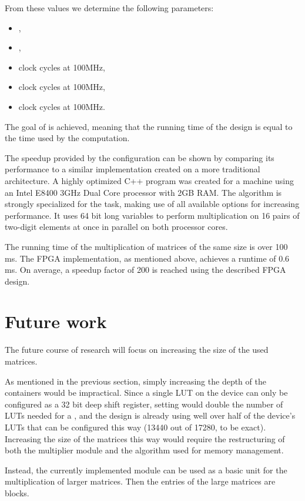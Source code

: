 \documentclass[11pt,twoside]{article}
\begin{document}
From these values we determine the following parameters:
\begin{itemize}
\item ,
\item ,
\item  clock cycles at 100MHz,
\item  clock cycles at 100MHz,
\item  clock cycles at 100MHz.
\end{itemize}
The goal of  is a\-chieved, meaning that the running time of the design is equal to the time used by the computation.

The speedup provided by the configuration can be shown by comparing its performance to a similar implementation created on a more traditional architecture. A highly optimized C++ program was created for a machine using an Intel E8400 3GHz Dual Core processor with 2GB RAM. The algorithm is strongly specialized for the task, making use of all available options for increasing performance. It uses 64 bit long variables to perform multiplication on 16 pairs of two-digit elements at once in parallel on both processor cores.

The running time of the multiplication of matrices of the same size is over 100 ms. The FPGA implementation, as mentioned above, achieves a runtime of 0.6 ms. On average, a speedup factor of 200 is reached using the described FPGA design.

\section{Future work}

The future course of research will focus on increasing the size of the used matrices.

As mentioned in the previous section, simply increasing the depth  of the  containers would be impractical. Since a single LUT on the device can only be configured as a 32 bit deep shift register, setting  would double the number of LUTs needed for a , and the design is already using well over half of the device's LUTs that can be configured this way (13440 out of 17280, to be exact). Increasing the size of the matrices this way would require the restructuring of both the multiplier module and the algorithm used for memory management.

Instead, the currently implemented module can be used as a basic unit for the multiplication of larger matrices. Then the entries of the large matrices are  blocks.
\end{document}
